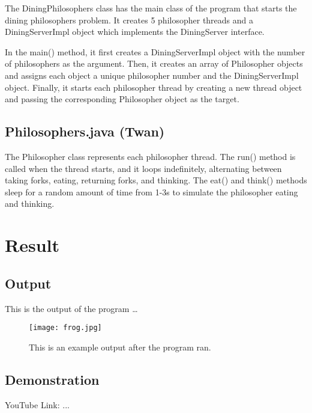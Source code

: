 \documentclass{article}
\begin{document}
The DiningPhilosophers class has the main class of the program that starts the dining philosophers problem. It creates 5 philosopher threads and a DiningServerImpl object which implements the DiningServer interface.

In the main() method, it first creates a DiningServerImpl object with the number of philosophers as the argument. Then, it creates an array of Philosopher objects and assigns each object a unique philosopher number and the DiningServerImpl object. Finally, it starts each philosopher thread by creating a new thread object and passing the corresponding Philosopher object as the target.

\subsection{Philosophers.java (Twan)}

The Philosopher class represents each philosopher thread. The run() method is called when the thread starts, and it loops indefinitely, alternating between taking forks, eating, returning forks, and thinking. The eat() and think() methods sleep for a random amount of time from 1-3s to simulate the philosopher eating and thinking.

\section{Result}
\subsection{Output}

This is the output of the program \dots

\begin{figure}
\centering
\texttt{[image: frog.jpg]}
\caption{\label{fig:frog}This is an example output after the program ran.}
\end{figure}
    
\subsection{Demonstration}

YouTube Link: ...
\end{document}
